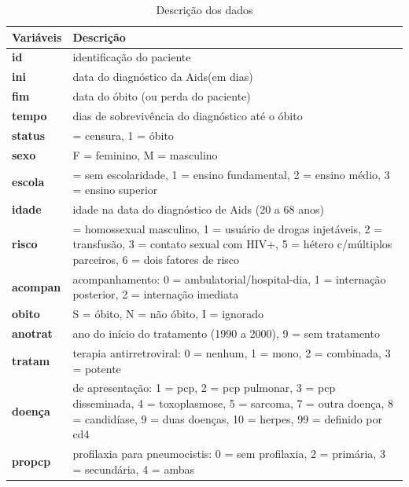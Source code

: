 \documentclass[a4paper, oneside]{book}\usepackage[]{graphicx}\usepackage[]{color}
\newenvironment{knitrout}{}{} %
\begin{document}
\begin{knitrout}
\color{fgcolor}\begin{table}

\caption{\label{tab:script0}Descrição dos dados}
\centering
\begin{tabular}[t]{>{\bfseries\leavevmode\color{red}}l|>{\raggedright\arraybackslash}p{30em}}
\hline
Variáveis & Descrição\\
\hline
id & identificação do paciente\\
\hline
ini & data do diagnóstico da Aids(em dias)\\
\hline
fim & data do óbito (ou perda do paciente)\\
\hline
tempo & dias de sobrevivência do diagnóstico até o óbito\\
\hline
status & 0 = censura, 1 = óbito\\
\hline
sexo & F = feminino, M = masculino\\
\hline
escola & 0 = sem escolaridade, 1 = ensino fundamental, 2 = ensino médio, 3 = ensino superior\\
\hline
idade & idade na data do diagnóstico de Aids (20 a 68 anos)\\
\hline
risco & 0 = homossexual masculino, 1 = usuário de drogas injetáveis, 2 = transfusão, 3 = contato sexual com HIV+, 5 = hétero c/múltiplos parceiros, 6 = dois fatores de risco\\
\hline
acompan & acompanhamento: 0 = ambulatorial/hospital-dia, 1 = internação posterior, 2 = internação imediata\\
\hline
obito & S = óbito, N = não óbito, I = ignorado\\
\hline
anotrat & ano do início do tratamento (1990 a 2000), 9 = sem tratamento\\
\hline
tratam & terapia antirretroviral: 0 = nenhum, 1 = mono, 2 = combinada, 3 = potente\\
\hline
doença & de apresentação: 1 = pcp, 2 = pcp pulmonar, 3 = pcp disseminada, 4 = toxoplasmose, 5 = sarcoma, 7 = outra doença, 8 = candidíase, 9 = duas doenças, 10 = herpes, 99 = definido por cd4\\
\hline
propcp & profilaxia para pneumocistis: 0 = sem profilaxia, 2 = primária, 3 = secundária, 4 = ambas\\
\hline
\end{tabular}
\end{table}


\end{knitrout}
\end{document}
